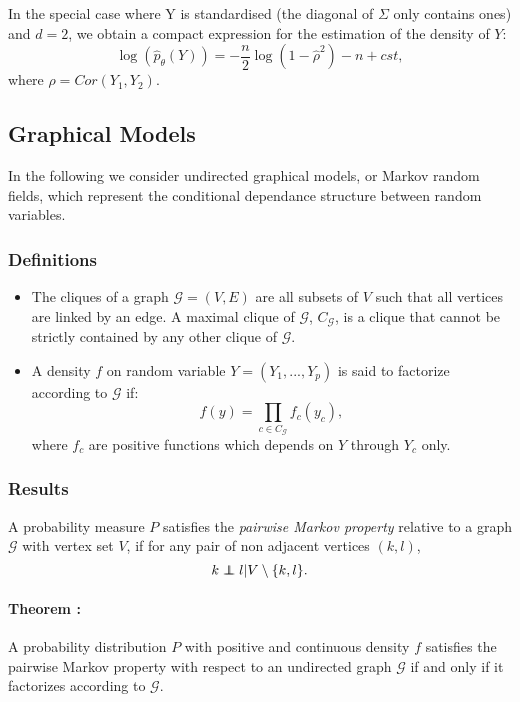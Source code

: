 \documentclass[a4paper,11pt]{article}
\newcommand\independent{\protect\mathpalette{\protect\independenT}{\perp}}
\def\independenT#1#2{\mathrel{\rlap{$#1#2$}\mkern2mu{#1#2}}}
\begin{document}
In the special case where Y is standardised (the diagonal of $\Sigma$ only contains ones) and $d=2$, we obtain a compact expression for the
estimation of the density of $Y$:
  \begin{equation}
   \label{gauss}
   \log(\hat{p}_\theta(Y))=-\frac{n}{2}\log(1-\hat{\rho}^2)-n + cst,
   \end{equation}
where $\rho = Cor(Y_1,Y_2)$.
  \subsection{Graphical Models}
  In the following we consider undirected graphical models, or Markov random fields, which represent the conditional dependance structure
  between random variables.
  \subsubsection{Definitions}
  \begin{itemize}
  \item The cliques of a graph $\mathcal{G}=(V,E)$ are all subsets of $V$ such that all vertices are linked by an edge. A maximal clique of $\mathcal{G}$,
  $C_\mathcal{G}$, is a clique that cannot be strictly contained by any other clique of $\mathcal{G}$.\\
  \item A density $f$ on random variable $Y=(Y_1,...,Y_p)$ is said to factorize according to $\mathcal{G}$ if:
  \[f(y)= \prod_{c\in C_\mathcal{G}} f_c(y_c),\]
  where $f_c$ are positive functions which depends on $Y$ through $Y_c$ only.
  \end{itemize}
  \subsubsection{Results}
  A probability measure $P$ satisfies the \textit{pairwise Markov property} relative to a graph $\mathcal{G}$ with vertex set $V$,
  if for any pair of non adjacent vertices $(k,l)$,
  \[k \independent l|V\setminus\{k,l\}.\]
  
  \paragraph{Theorem  \cite{ham}:} A probability distribution $P$ with positive and continuous density $f$ satisfies
  the pairwise Markov property with respect to an undirected graph $\mathcal{G}$ if and only if it factorizes according to $\mathcal{G}$.
  
  
\end{document}
